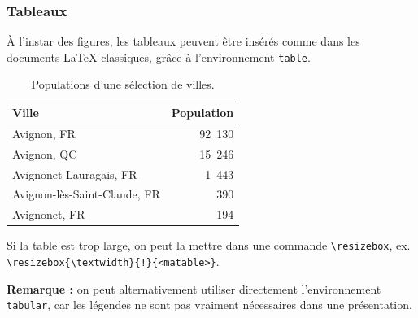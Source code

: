 \documentclass[10pt,    %
    french,             %
    xcolor=table,       %
    envcountsect,       %
    aspectratio=43      %
]{beamer}
\begin{document}
\begin{frame}
    \frametitle{Tableaux}

    À l'instar des figures, les tableaux peuvent être insérés comme dans les documents \LaTeX{} classiques, grâce à l'environnement \texttt{table}.

    \begin{table}[H]
        \centering
        \begin{tabular}{l r}
            \hline
	        \rowcolor{fgLightRed} 
            \textbf{Ville} & \textbf{Population} \\
            \hline
            Avignon, FR & 92~130 \\
            Avignon, QC & 15~246 \\
            Avignonet-Lauragais, FR & 1~443 \\
            Avignon-lès-Saint-Claude, FR & 390 \\
            Avignonet, FR & 194 \\
            \hline
        \end{tabular}
        \caption{Populations d'une sélection de villes.}
        \label{tab:population}
    \end{table}
    
    \vspace{-0.4cm}
    Si la table est trop large, on peut la mettre dans une commande \texttt{\textbackslash{}resizebox}, ex. \texttt{\textbackslash{}resizebox\{\textbackslash{}textwidth\}\{!\}\{<matable>\}}.
    
    
    
    

    \vspace{0.25cm}
    \textbf{Remarque :} on peut alternativement utiliser directement l'environnement \texttt{tabular}, car les légendes ne sont pas vraiment nécessaires dans une présentation.
\end{frame}
    
\end{document}
